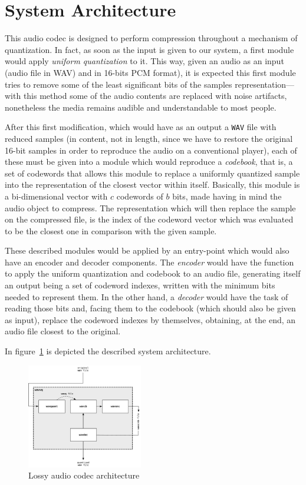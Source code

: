 \documentclass[conference]{IEEEtran}
\begin{document}
\section{System Architecture}

This audio codec is designed to perform compression throughout a mechanism of quantization. In fact, as soon as the input is given to our system, a first module would apply \emph{uniform quantization} to it. This way, given an audio as an input (audio file in \ac{WAV})  and in 16-bits \ac{PCM} format), it is expected this first module tries to remove some of the least significant bits of the samples representation—with this method some of the audio contents are replaced with noise artifacts, nonetheless the media remains audible and understandable to most people.

After this first modification, which would have as an output a \texttt{\acs{WAV}} file with reduced samples (in content, not in length, since we have to restore the original 16-bit samples in order to reproduce the audio on a conventional player), each of these must be given into a module which would reproduce a \emph{codebook}, that is, a set of codewords that allows this module to replace a uniformly quantized sample into the representation of the closest vector within itself. Basically, this module is a bi-dimensional vector with $c$ codewords of $b$ bits, made having in mind the audio object to compress. The representation which will then replace the sample on the compressed file, is the index of the codeword vector which was evaluated to be the closest one in comparison with the given sample.

These described modules would be applied by an entry-point which would also have an encoder and decoder components. The \emph{encoder} would have the function to apply the uniform quantization and codebook to an audio file, generating itself an output being a set of codeword indexes, written with the minimum bits needed to represent them. In the other hand, a \emph{decoder} would have the task of reading those bits and, facing them to the codebook (which should also be given as input), replace the codeword indexes by themselves, obtaining, at the end, an audio file closest to the original.

In figure~\ref{fig:system-wide-architecture} is depicted the described system architecture.

\begin{figure}
	\centering
	\includegraphics[width=0.45\textwidth]{figs/system-wide-architecture}
	\caption{Lossy audio codec architecture}
    \label{fig:system-wide-architecture}
\end{figure}
\end{document}
